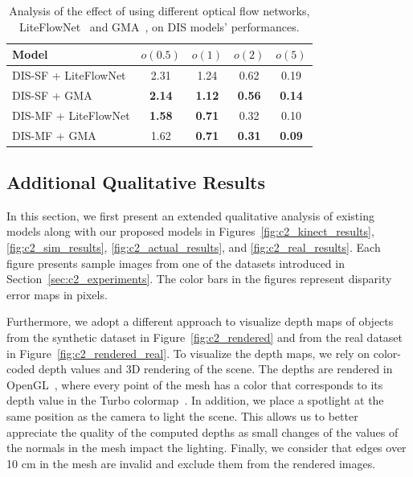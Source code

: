 \begin{table}[t]
    \begin{center}
        \begin{tabular}{lcccc}
        \hline
        Model & $o(0.5)$ & $o(1)$ & $o(2)$ & $o(5)$ \\
        \hline
        DIS-SF + LiteFlowNet & 2.31 & 1.24 & 0.62 & 0.19 \\
        DIS-SF + GMA & \textbf{2.14} & \textbf{1.12} & \textbf{0.56} & \textbf{0.14} \\
        \hline
        DIS-MF + LiteFlowNet & \textbf{1.58} & \textbf{0.71} & 0.32 & 0.10 \\
        DIS-MF + GMA & 1.62 & \textbf{0.71} & \textbf{0.31} & \textbf{0.09} \\
        \hline
        \end{tabular}
    \end{center}
    \caption{Analysis of the effect of using different optical flow networks, LiteFlowNet~\citep{hui2018liteflownet} and GMA~\citep{jiang2021learning}, on DIS models' performances.}
    \label{table:ablation_gma}
\end{table}

\subsection{Additional Qualitative Results} \label{sec:c2_additional_results}
In this section, we first present an extended qualitative analysis of existing models along with our proposed models in Figures~\ref{fig:c2_kinect_results}, \ref{fig:c2_sim_results}, \ref{fig:c2_actual_results}, and \ref{fig:c2_real_results}. Each figure presents sample images from one of the datasets introduced in Section~\ref{sec:c2_experiments}. The color bars in the figures represent disparity error maps in pixels.

Furthermore, we adopt a different approach to visualize depth maps of objects from the synthetic dataset in Figure~\ref{fig:c2_rendered} and from the real dataset in Figure~\ref{fig:c2_rendered_real}. To visualize the depth maps, we rely on color-coded depth values and 3D rendering of the scene. The depths are rendered in OpenGL~\citep{shreiner2013opengl}, where every point of the mesh has a color that corresponds to its depth value in the Turbo colormap~\citep{mikhailov2019turbo}. In addition, we place a spotlight at the same position as the camera to light the scene. This allows us to better appreciate the quality of the computed depths as small changes of the values of the normals in the mesh impact the lighting. Finally, we consider that edges over 10 cm in the mesh are invalid and exclude them from the rendered images.


